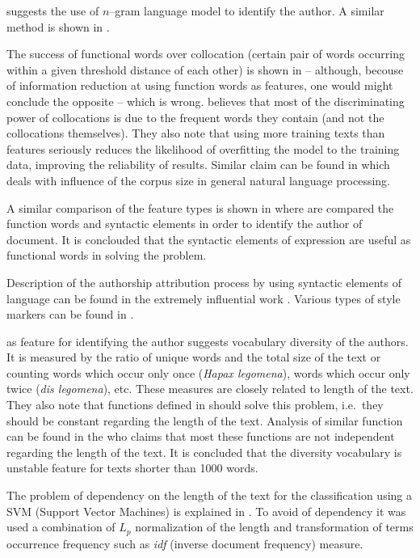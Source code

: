 \documentclass[11pt,english]{article}
\begin{document}
\begin{multicols}{2}
\citet{peng2003language} suggests the use of $n$--gram language model to identify
the author. A similar method is shown in \citep{coyotl2006authorship}.

The success of functional words over collocation (certain pair of words occurring
within a given threshold distance of each other) is shown in
\citep{argamon2005measuring} -- although, becouse of information reduction at
using function words as features, one would might conclude the opposite -- which
is wrong. \citet{argamon2005measuring} believes that most of the discriminating
power of collocations is due to the frequent words they contain (and not the
collocations themselves). They also note that using more training texts than
features seriously reduces the likelihood of overfitting the model to the
training data, improving the reliability of results. Similar claim can be found
in \citep{banko2001scaling} which deals with influence of the corpus size in
general natural language processing.

A similar comparison of the feature types is shown in
\citep{uzuner2005comparative} where are compared the function words and syntactic
elements in order to identify the author of document. It is conclouded that the
syntactic elements of expression are useful as functional words in solving the
problem.

Description of the authorship attribution process by using syntactic elements
of language can be found in the extremely influential work
\citep{stamatatos2001computer}. Various types of style markers can be found in
\citep{diri2003automatic,luyckx2005shallow}.

\citet{stamatatos2001computer} as feature for identifying the author suggests
vocabulary diversity of the authors. It is measured by the ratio of unique words
and the total size of the text or counting words which occur only once
(\emph{Hapax legomena}), words which occur only twice (\emph{dis legomena}), etc.
These measures are closely related to length of the text. They also note that
functions defined in \citep{yule1944statistical,honore1979some}
should solve this problem, i.e.\ they should be constant regarding the length of
the text. Analysis of similar function can be found in the
\citep{tweedie1998variable} who claims that most these functions are not
independent regarding the length of the text. It is concluded that the diversity
vocabulary is unstable feature for texts shorter than 1000 words.

The problem of dependency on the length of the text for the classification using
a SVM (Support Vector Machines) is explained in \citep{diederich2003authorship}.
To avoid of dependency it was used a combination of $L_p$ normalization of the
length and transformation of terms occurrence frequency such as \emph{idf}
(inverse document frequency) measure.


\end{multicols}
\end{document}
